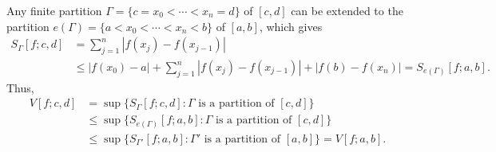 \documentclass[a4paper,12pt]{article}
\begin{document}
\begin{enumerate}
\begin{enumerate}
{                }\unboldmath \par
                Any finite partition
                $\Gamma = \{ c = x_0 < \cdots < x_n = d \}$
                of $[c, d]$ can be extended to the partition
                $e(\Gamma) = \{ a < x_0 < \cdots < x_n < b \}$
                of $[a, b]$, which gives
                \begin{align*}
                    S_\Gamma[f; c, d] &= \sum_{j = 1}^n |f(x_j) - f(x_{j - 1})| \\
                    &\leq |f(x_0) - a| + \sum_{j = 1}^n |f(x_j) - f(x_{j - 1})| + |f(b) - f(x_n)| = S_{e(\Gamma)}[f; a, b].
                \end{align*}
                Thus,
                \begin{align*}
                    V[f; c, d] &= \sup\{ S_\Gamma[f; c, d] : \Gamma \text{ is a partition of } [c, d] \} \\
                    &\leq \sup\{ S_{e(\Gamma)}[f; a, b] : \Gamma \text{ is a partition of } [c, d] \} \\
                    &\leq \sup\{ S_{\Gamma'}[f; a, b] : \Gamma' \text{ is a partition of } [a, b] \}
                    = V[f; a, b].
                \end{align*}
        \end{enumerate}


\end{enumerate}
\end{document}
